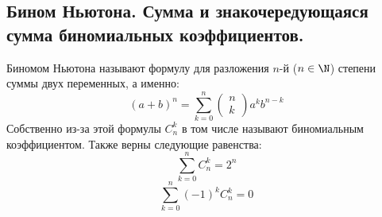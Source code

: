 \subsection{Бином Ньютона. Сумма и знакочередующаяся сумма биномиальных коэффициентов.}
Биномом Ньютона называют формулу для разложения $n$-й ($n \in \N$) степени суммы двух переменных, а именно:
$$(a + b)^n = \sum_{k=0}^{n} \begin{pmatrix}n\\k\end{pmatrix}a^{k}b^{n-k}$$
Собственно из-за этой формулы $C^k_n$ в том числе называют биномиальным коэффициентом. Также верны следующие равенства:
$$\sum_{k=0}^{n} C_n^k = 2^n$$
$$\sum_{k=0}^{n} (-1)^kC_n^k = 0$$
